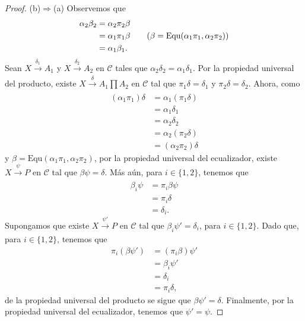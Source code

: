 \documentclass[tesis]{subfiles}
\begin{document}
\begin{proof}
    (b)$\Rightarrow$(a) Observemos que
    \begin{align*}
        \alpha_2\beta_2 &= \alpha_2\pi_2\beta \\
                        &= \alpha_1\pi_1\beta \tag{$\beta = \text{Equ}(\alpha_1\pi_1,\alpha_2\pi_2)$} \\
                        &= \alpha_1\beta_1.
    \end{align*}
    Sean $X\xrightarrow[]{\delta_1} A_1$ y $X\xrightarrow[]{\delta_2} A_2$ en $\mathscr{C}$ tales que $\alpha_2\delta_2 = \alpha_1\delta_1$. Por la propiedad universal del producto, existe $X\xrightarrow[]{\delta} A_1\prod A_2$ en $\mathscr{\mathscr{C}}$ tal que $\pi_1\delta = \delta_1$ y $\pi_2\delta = \delta_2$. Ahora, como
    \begin{align*}
        (\alpha_1\pi_1)\delta &= \alpha_1(\pi_1\delta) \\
                              &= \alpha_1\delta_1 \\
                              &= \alpha_2\delta_2 \\
                              &= \alpha_2(\pi_2\delta) \\
                              &= (\alpha_2\pi_2)\delta
    \end{align*}
    y $\beta = \text{Equ}(\alpha_1\pi_1,\alpha_2\pi_2)$, por la propiedad universal del ecualizador, existe $X\xrightarrow[]{\psi} P$ en $\mathscr{C}$ tal que $\beta\psi=\delta$. Más aún, para $i\in\{1,2\}$, tenemos que
    \begin{align*}
        \beta_i\psi &= \pi_i\beta\psi \\
                    &= \pi_i\delta \\
                    &= \delta_i.
    \end{align*}
    Supongamos que existe $X\xrightarrow[]{\psi'}P$ en $\mathscr{C}$ tal que $\beta_i\psi' = \delta_i$, para $i\in\{1,2\}$. Dado que, para $i\in\{1,2\}$, tenemos que
    \begin{align*}
        \pi_i(\beta\psi') &= (\pi_i\beta)\psi' \\
                          &= \beta_i\psi' \\
                          &= \delta_i \\
                          &= \pi_i\delta,
    \end{align*}
    de la propiedad universal del producto se sigue que $\beta\psi' = \delta$. Finalmente, por la propiedad universal del ecualizador, tenemos que $\psi' = \psi$.
\end{proof}
\end{document}
